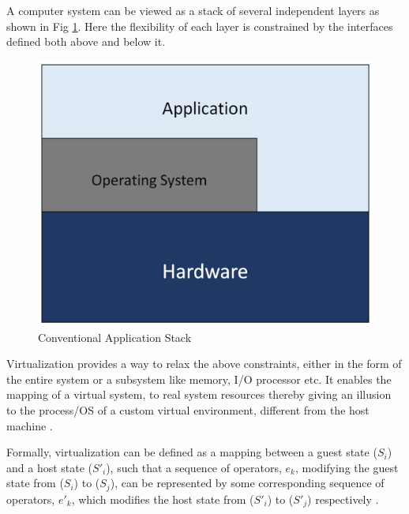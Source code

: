 A computer system can be viewed as a stack of several independent layers as shown in Fig \ref{fig:appstack}. Here the flexibility of each layer is constrained by the interfaces defined both above and below it. 

\setlength{\belowcaptionskip}{-10pt}

\begin{figure}[H]
  \centering
  \includegraphics[scale=0.6]{figures/app_stack.png}
  \caption{Conventional Application Stack}
  \label{fig:appstack}
\end{figure}

Virtualization provides a way to relax the above constraints, either in the form of the entire system or a subsystem like memory, I/O processor etc. It enables the mapping of a virtual system, to real system resources thereby giving an illusion to the process/OS of a custom virtual environment, different from the host machine \cite{virt_arch}.

Formally, virtualization can be defined as a mapping between a guest state ($S_i$) and a host state ($S'_i$), such that a sequence of operators, $e_k$, modifying the guest state from ($S_i$) to ($S_j$), can be represented by some corresponding sequence of operators, $e'_k$, which modifies the host state from ($S'_i$) to ($S'_j$) respectively \cite{smith_nair}. 

\setlength{\belowcaptionskip}{-10pt}

